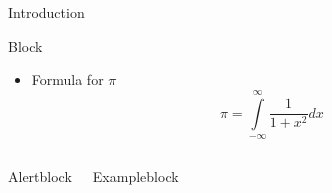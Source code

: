 \begin{frame}{Introduction}
    \begin{block}{Block}
        \begin{itemize}
            \item Formula for $\pi$
            \begin{equation}
                \pi = \int\limits_{-\infty}^{\infty}\frac{1}{1+x^2}dx
            \end{equation}
        \end{itemize}
    \end{block}

    \begin{columns}
                    \begin{alertblock}{Alertblock}

                    \end{alertblock}

                \begin{exampleblock}{Exampleblock}

                \end{exampleblock}
    \end{columns}
\end{frame}
